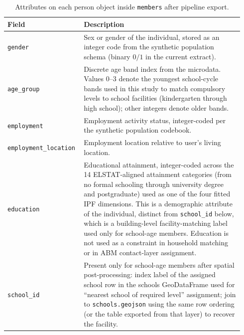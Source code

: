 \documentclass{article}
\begin{document}
\begin{table}[htbp]
  \centering

  \begin{tabular}{@{}p{0.28\linewidth}p{0.66\linewidth}@{}}
    \toprule
    \textbf{Field} & \textbf{Description} \\
    \midrule
    \texttt{gender} &
    Sex or gender of the individual, stored as an integer code from the synthetic population schema (binary $0/1$ in the current extract). \\
    \texttt{age\_group} &
    Discrete age band index from the microdata. Values $0$--$3$ denote the youngest school-cycle bands used in this study to match compulsory levels to school facilities (kindergarten through high school); other integers denote older bands. \\
    \texttt{employment} &
    Employment activity status, integer-coded per the synthetic population codebook. \\
    \texttt{employment\_location} &
    Employment location relative to user's living location. \\
    \texttt{education} &
    Educational attainment, integer-coded across the 14 ELSTAT-aligned attainment categories (from no formal schooling through university degree and postgraduate) used as one of the four fitted IPF dimensions. This is a demographic attribute of the individual, distinct from \texttt{school\_id} below, which is a building-level facility-matching label used only for school-age members. Education is not used as a constraint in household matching or in ABM contact-layer assignment. \\
    \texttt{school\_id} &
    Present only for school-age members after spatial post-processing: index label of the assigned school row in the schools GeoDataFrame used for ``nearest school of required level'' assignment; join to \texttt{schools.geojson} using the same row ordering (or the table exported from that layer) to recover the facility. \\
    \bottomrule
  \end{tabular}
    \caption{Attributes on each person object inside 
  \label{tab:agent_export_legend}
    \texttt{members} after pipeline export.}
\end{table}
\end{document}
